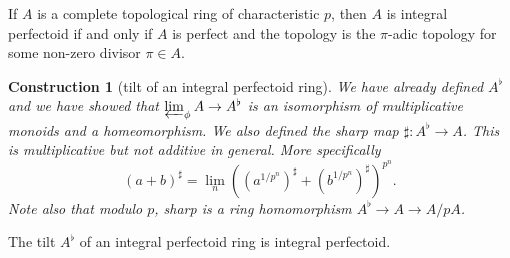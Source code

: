 \documentclass[a4paper]{article}
\newcommand{\tilt}{\flat} %
\newtheorem*{construction}{Construction}
\begin{document}
\begin{ex}
  If \(A\) is a complete topological ring of characteristic \(p\), then \(A\) is integral perfectoid if and only if \(A\) is perfect and the topology is the \(\pi\)-adic topology for some non-zero divisor \(\pi \in A\).
\end{ex}

\begin{construction}[tilt of an integral perfectoid ring]
  We have already defined \(A^\tilt\) and we have showed that \(\varprojlim_\phi A \to A^\tilt\) is an isomorphism of multiplicative monoids and a homeomorphism. We also defined the sharp map \(\sharp: A^\tilt \to A\). This is multiplicative but not additive in general. More specifically
  \[
    (a + b)^\sharp = \lim_n ((a^{1/p^n})^\sharp + (b^{1/p^n})^\sharp)^{p^n}.
  \]
  Note also that modulo \(p\), sharp is a ring homomorphism \(A^\tilt \to A \to A/pA\).
\end{construction}

\begin{lemma}
  The tilt \(A^\tilt\) of an integral perfectoid ring is integral perfectoid.
\end{lemma}
\end{document}
